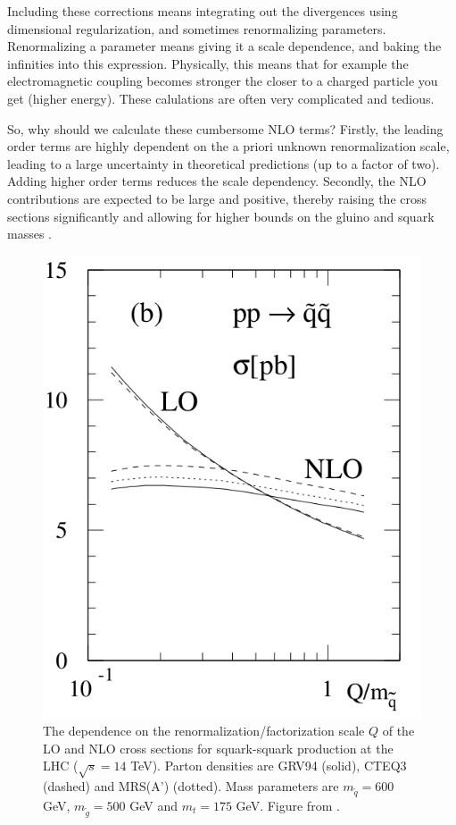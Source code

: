 \documentclass[twoside,english]{uiofysmaster}
\begin{document}
Including these corrections means integrating out the divergences using dimensional regularization, and sometimes renormalizing parameters. Renormalizing a parameter means giving it a scale dependence, and baking the infinities into this expression. Physically, this means that for example the electromagnetic coupling becomes stronger the closer to a charged particle you get (higher energy). These calulations are often very complicated and tedious.

So, why should we calculate these cumbersome NLO terms? Firstly, the leading order terms are highly dependent on the a priori unknown renormalization scale, leading to a large uncertainty in theoretical predictions (up to a factor of two). Adding higher order terms reduces the scale dependency. Secondly, the NLO contributions are expected to be large and positive, thereby raising the cross sections significantly and allowing for higher bounds on the gluino and squark masses \cite{beenakker1997squark}.

\begin{figure}
\centering
\includegraphics[scale=0.4]{squark_gluino_LO_NLO.png}
\caption{The dependence on the renormalization/factorization scale $Q$ of the LO and NLO cross sections for squark-squark production at the LHC ($\sqrt{s}=14$ TeV). Parton densities are GRV94 (solid), CTEQ3 (dashed) and MRS(A') (dotted). Mass parameters are $m_{\tilde{q}}=600$ GeV, $m_{\tilde{g}}=500$ GeV and $m_t=175$ GeV. Figure from \cite{beenakker1997squark}.}
\label{Fig:: hadron susy : LO vs NLO beenakker}
\end{figure}
\end{document}
